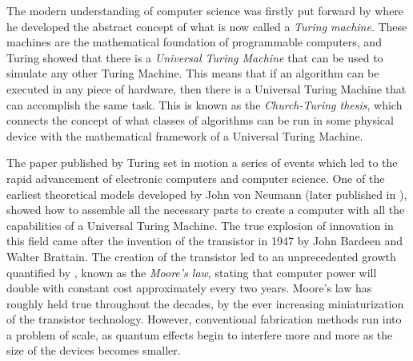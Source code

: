 \documentclass[../../dissertation.tex]{subfiles}
\begin{document}
The modern understanding of computer science was firstly put forward by
\cite{turing1936} where he developed the abstract concept of what is now called
a \textit{Turing machine}. These machines are the mathematical foundation of
programmable computers, and Turing showed that there is a \textit{Universal
Turing Machine} that can be used to simulate any other Turing Machine. This
means that if an algorithm can be executed in any piece of hardware, then there
is a Universal Turing Machine that can accomplish the same task. This is known as
the \textit{Church-Turing thesis}, which connects the concept of what classes
of algorithms can be run in some physical device with the mathematical
framework of a Universal Turing Machine.\par The paper published by Turing set
in motion a series of events which led to the rapid advancement of electronic
computers and computer science. One of the earliest theoretical models
developed by John von Neumann (later published in \cite{Neumann93}),
showed how to assemble all the necessary parts to create a computer with all
the capabilities of a Universal Turing Machine. The true explosion of
innovation in this field came after the invention of the transistor in 1947 by
John Bardeen and Walter Brattain. The creation of the transistor led to an
unprecedented growth quantified by \cite{moore1965}, known as the
\textit{Moore's law}, stating that computer power will double with constant
cost approximately every two years. Moore's law has roughly held true
throughout the decades, by the ever increasing miniaturization of the
transistor technology. However, conventional fabrication methods run into a
problem of scale, as quantum effects begin to interfere more and more as the size of the
devices becomes smaller.\par
\end{document}
